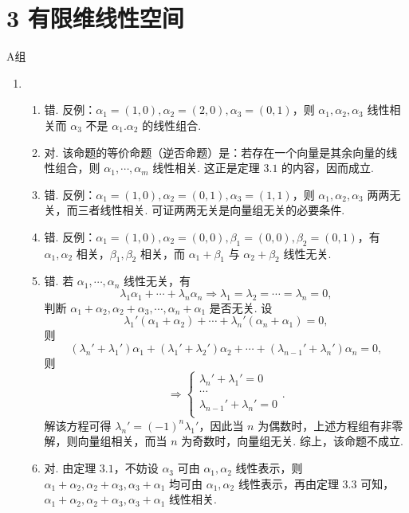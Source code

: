 \section*{3 有限维线性空间}

\vspace{2ex}

\centerline{\heiti A组}
\begin{enumerate}
    \item \begin{enumerate}
        \item 错. 反例：$\alpha_1=(1,0),\alpha_2=(2,0),\alpha_3=(0,1)$，则 $\alpha_1,\alpha_2,\alpha_3$ 线性相关而 $\alpha_3$ 不是 $\alpha_1.\alpha_2$ 的线性组合.
        \item 对. 该命题的等价命题（逆否命题）是：若存在一个向量是其余向量的线性组合，则 $\alpha_1,\cdots,\alpha_m$ 线性相关. 这正是定理 $3.1$ 的内容，因而成立.
        \item 错. 反例：$\alpha_1=(1,0),\alpha_2=(0,1),\alpha_3=(1,1)$，则 $\alpha_1,\alpha_2,\alpha_3$ 两两无关，而三者线性相关. 可证两两无关是向量组无关的必要条件.
        \item 错. 反例：$\alpha_1=(1,0),\alpha_2=(0,0),\beta_1=(0,0),\beta_2=(0,1)$，有 $\alpha_1,\alpha_2$ 相关，$\beta_1,\beta_2$ 相关，而 $\alpha_1+\beta_1$ 与 $\alpha_2+\beta_2$ 线性无关.
        \item 错. 若 $\alpha_1,\cdots,\alpha_n$ 线性无关，有
        \[\lambda_1\alpha_1+\cdots+\lambda_n\alpha_n\Rightarrow\lambda_1=\lambda_2=\cdots=\lambda_n=0,\]
        判断 $\alpha_1+\alpha_2,\alpha_2+\alpha_3,\cdots,\alpha_n+\alpha_1$ 是否无关. 设
        \[\lambda_1'(\alpha_1+\alpha_2)+\cdots+\lambda_n'(\alpha_n+\alpha_1)=0,\]
        则
        \[(\lambda_n'+\lambda_1')\alpha_1+(\lambda_1'+\lambda_2')\alpha_2+\cdots+(\lambda_{n-1}'+\lambda_{n}')\alpha_n=0,\]
        则
        \[\Rightarrow \begin{cases}
		\lambda_n'+\lambda_1'=0 \\
		\cdots \\
		\lambda_{n-1}'+\lambda_{n}' =0\\
	    \end{cases}.\]
        解该方程可得 $\lambda_n'=(-1)^n\lambda_1'$，因此当 $n$ 为偶数时，上述方程组有非零解，则向量组相关，而当 $n$ 为奇数时，向量组无关. 综上，该命题不成立.
        \item 对. 由定理 $3.1$，不妨设 $\alpha_3$ 可由 $\alpha_1,\alpha_2$ 线性表示，则 $\alpha_1+\alpha_2,\alpha_2+\alpha_3,\alpha_3+\alpha_1$ 均可由 $\alpha_1,\alpha_2$ 线性表示，再由定理 $3.3$ 可知，$\alpha_1+\alpha_2,\alpha_2+\alpha_3,\alpha_3+\alpha_1$ 线性相关.

\end{enumerate}
\end{enumerate}
